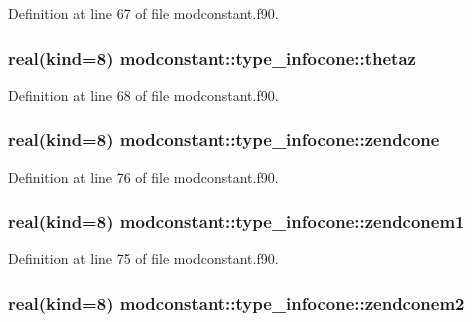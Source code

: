 Definition at line 67 of file modconstant.\-f90.

\hypertarget{structmodconstant_1_1type__infocone_adcd504c2ef07d2b86ede4b22fdf7d230}{
\subsubsection[{thetaz}]{\setlength{\rightskip}{0pt plus 5cm}real(kind=8) modconstant\-::type\-\_\-infocone\-::thetaz}}\label{structmodconstant_1_1type__infocone_adcd504c2ef07d2b86ede4b22fdf7d230}


Definition at line 68 of file modconstant.\-f90.

\hypertarget{structmodconstant_1_1type__infocone_af14e8a4dfd266d20df12a5423fa5d498}{
\subsubsection[{zendcone}]{\setlength{\rightskip}{0pt plus 5cm}real(kind=8) modconstant\-::type\-\_\-infocone\-::zendcone}}\label{structmodconstant_1_1type__infocone_af14e8a4dfd266d20df12a5423fa5d498}


Definition at line 76 of file modconstant.\-f90.

\hypertarget{structmodconstant_1_1type__infocone_afa95773c4532988173a5acffd5e863b9}{
\subsubsection[{zendconem1}]{\setlength{\rightskip}{0pt plus 5cm}real(kind=8) modconstant\-::type\-\_\-infocone\-::zendconem1}}\label{structmodconstant_1_1type__infocone_afa95773c4532988173a5acffd5e863b9}


Definition at line 75 of file modconstant.\-f90.

\hypertarget{structmodconstant_1_1type__infocone_a25413fc9488146e4ba60e0736a7662de}{
\subsubsection[{zendconem2}]{\setlength{\rightskip}{0pt plus 5cm}real(kind=8) modconstant\-::type\-\_\-infocone\-::zendconem2}}\label{structmodconstant_1_1type__infocone_a25413fc9488146e4ba60e0736a7662de}


